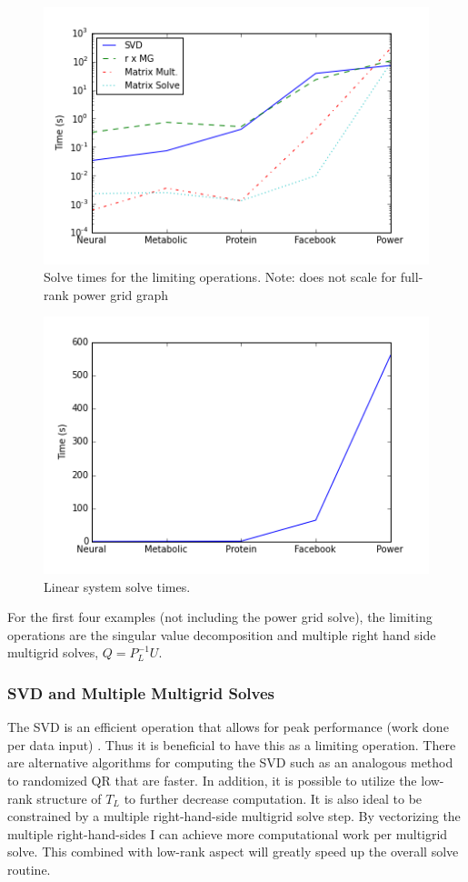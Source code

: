 \documentclass{article}
\begin{document}
\begin{figure}[H]
\centering
\includegraphics[width = \linewidth]{operationtimes.png}
\caption{Solve times for the limiting operations. Note: does not scale for full-rank power grid graph}
\end{figure}

\begin{figure}[H]
\centering
\includegraphics[width = \linewidth]{stimes.png}
\caption{Linear system solve times.}
\end{figure}

For the first four examples (not including the power grid solve), the limiting operations are the singular value decomposition and multiple right hand side multigrid solves, $Q = P_L^{-1}U$. 
\subsubsection{SVD and Multiple Multigrid Solves}
The SVD is an efficient operation that allows for peak performance (work done per data input) \cite{Berry:2006}. Thus it is beneficial to have this as a limiting operation. There are alternative algorithms for computing the SVD such as an analogous method to randomized QR \cite{Halko:2011} that are faster. In addition, it is possible to utilize the low-rank structure of $T_L$ to further decrease computation. It is also ideal to be constrained by a multiple right-hand-side multigrid solve step. By vectorizing the multiple right-hand-sides I can achieve more computational work per multigrid solve. This combined with low-rank aspect will greatly speed up the overall solve routine.
\end{document}
